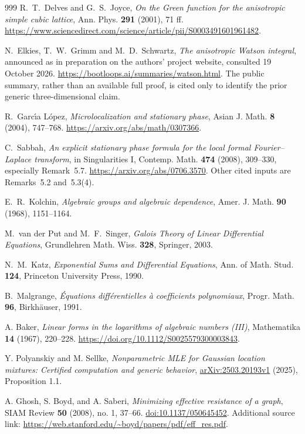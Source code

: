 \documentclass[11pt,a4paper]{article}
\theoremstyle{definition}
\theoremstyle{remark}
\numberwithin{equation}{section}
\begin{document}
\begin{thebibliography}{999}
R.~T.~Delves and G.~S.~Joyce,
\emph{On the Green function for the anisotropic simple cubic lattice},
Ann. Phys. \textbf{291} (2001), 71 ff.
\url{https://www.sciencedirect.com/science/article/pii/S0003491601961482}.

N.~Elkies, T.~W.~Grimm and M.~D.~Schwartz,
\emph{The anisotropic Watson integral}, announced as in preparation
on the authors' project website, consulted 19 October 2026.
\url{https://bootloops.ai/summaries/watson.html}.
The public summary, rather than an available full proof, is cited
only to identify the prior generic three-dimensional claim.

R.~Garc\'{\i}a L\'opez,
\emph{Microlocalization and stationary phase},
Asian J. Math. \textbf{8} (2004), 747--768.
\url{https://arxiv.org/abs/math/0307366}.

C.~Sabbah, \emph{An explicit stationary phase formula for the local
formal Fourier--Laplace transform}, in Singularities I,
Contemp. Math. \textbf{474} (2008), 309--330, especially Remark~5.7.
\url{https://arxiv.org/abs/0706.3570}.
Other cited inputs are Remarks~5.2 and~5.3(4).

E.~R.~Kolchin, \emph{Algebraic groups and algebraic dependence},
Amer. J. Math. \textbf{90} (1968), 1151--1164.

M.~van der Put and M.~F.~Singer,
\emph{Galois Theory of Linear Differential Equations},
Grundlehren Math. Wiss. \textbf{328}, Springer, 2003.

N.~M.~Katz, \emph{Exponential Sums and Differential Equations},
Ann. of Math. Stud. \textbf{124}, Princeton University Press, 1990.

B.~Malgrange, \emph{\'Equations diff\'erentielles \`a coefficients
polynomiaux}, Progr. Math. \textbf{96}, Birkh\"auser, 1991.

A. Baker,
\emph{Linear forms in the logarithms of algebraic numbers (III)},
Mathematika \textbf{14} (1967), 220--228.
\url{https://doi.org/10.1112/S0025579300003843}.

Y. Polyanskiy and M. Sellke,
\emph{Nonparametric MLE for Gaussian location mixtures: Certified
computation and generic behavior},
\href{https://arxiv.org/html/2503.20193v1}{arXiv:2503.20193v1}
(2025), Proposition 1.1.

A. Ghosh, S. Boyd, and A. Saberi,
\emph{Minimizing effective resistance of a graph},
SIAM Review \textbf{50} (2008), no. 1, 37--66.
\href{https://doi.org/10.1137/050645452}{doi:10.1137/050645452}.
Additional source link: \url{https://web.stanford.edu/~boyd/papers/pdf/eff_res.pdf}.


\end{thebibliography}
\end{document}
